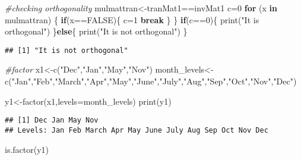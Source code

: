 \documentclass[
]{article}
\newenvironment{Shaded}{\begin{snugshade}}{\end{snugshade}}
\newcommand{\AttributeTok}[1]{\textcolor[rgb]{0.77,0.63,0.00}{#1}}
\newcommand{\CommentTok}[1]{\textcolor[rgb]{0.56,0.35,0.01}{\textit{#1}}}
\newcommand{\ConstantTok}[1]{\textcolor[rgb]{0.00,0.00,0.00}{#1}}
\newcommand{\ControlFlowTok}[1]{\textcolor[rgb]{0.13,0.29,0.53}{\textbf{#1}}}
\newcommand{\DecValTok}[1]{\textcolor[rgb]{0.00,0.00,0.81}{#1}}
\newcommand{\FunctionTok}[1]{\textcolor[rgb]{0.00,0.00,0.00}{#1}}
\newcommand{\NormalTok}[1]{#1}
\newcommand{\OtherTok}[1]{\textcolor[rgb]{0.56,0.35,0.01}{#1}}
\newcommand{\SpecialCharTok}[1]{\textcolor[rgb]{0.00,0.00,0.00}{#1}}
\newcommand{\StringTok}[1]{\textcolor[rgb]{0.31,0.60,0.02}{#1}}
\begin{document}
\begin{Shaded}
\begin{Highlighting}[]
\CommentTok{\#checking orthogonality}
\NormalTok{mulmattran}\OtherTok{\textless{}{-}}\NormalTok{tranMat1}\SpecialCharTok{==}\NormalTok{invMat1}
\NormalTok{c}\OtherTok{=}\DecValTok{0}
\ControlFlowTok{for}\NormalTok{ (x }\ControlFlowTok{in}\NormalTok{ mulmattran) \{}
  \ControlFlowTok{if}\NormalTok{(x}\SpecialCharTok{==}\ConstantTok{FALSE}\NormalTok{)\{}
\NormalTok{    c}\OtherTok{=}\DecValTok{1}
    \ControlFlowTok{break}
\NormalTok{  \}}
\NormalTok{\}}
\ControlFlowTok{if}\NormalTok{(c}\SpecialCharTok{==}\DecValTok{0}\NormalTok{)\{}
  \FunctionTok{print}\NormalTok{(}\StringTok{"It is orthogonal"}\NormalTok{)}
\NormalTok{\}}\ControlFlowTok{else}\NormalTok{\{}
  \FunctionTok{print}\NormalTok{(}\StringTok{"It is not orthogonal"}\NormalTok{)}
\NormalTok{\}}
\end{Highlighting}
\end{Shaded}

\begin{verbatim}
## [1] "It is not orthogonal"
\end{verbatim}

\begin{Shaded}
\begin{Highlighting}[]
\CommentTok{\#factor}
\NormalTok{x1}\OtherTok{\textless{}{-}}\FunctionTok{c}\NormalTok{(}\StringTok{"Dec"}\NormalTok{,}\StringTok{"Jan"}\NormalTok{,}\StringTok{"May"}\NormalTok{,}\StringTok{"Nov"}\NormalTok{)}
\NormalTok{month\_levels}\OtherTok{\textless{}{-}}\FunctionTok{c}\NormalTok{(}\StringTok{"Jan"}\NormalTok{,}\StringTok{"Feb"}\NormalTok{,}\StringTok{"March"}\NormalTok{,}\StringTok{"Apr"}\NormalTok{,}\StringTok{"May"}\NormalTok{,}\StringTok{"June"}\NormalTok{,}\StringTok{"July"}\NormalTok{,}\StringTok{"Aug"}\NormalTok{,}\StringTok{"Sep"}\NormalTok{,}\StringTok{"Oct"}\NormalTok{,}\StringTok{"Nov"}\NormalTok{,}\StringTok{"Dec"}\NormalTok{)}

\NormalTok{y1}\OtherTok{\textless{}{-}}\FunctionTok{factor}\NormalTok{(x1,}\AttributeTok{levels=}\NormalTok{month\_levels)}
\FunctionTok{print}\NormalTok{(y1)}
\end{Highlighting}
\end{Shaded}

\begin{verbatim}
## [1] Dec Jan May Nov
## Levels: Jan Feb March Apr May June July Aug Sep Oct Nov Dec
\end{verbatim}

\begin{Shaded}
\begin{Highlighting}[]
\FunctionTok{is.factor}\NormalTok{(y1)}
\end{Highlighting}
\end{Shaded}
\end{document}
